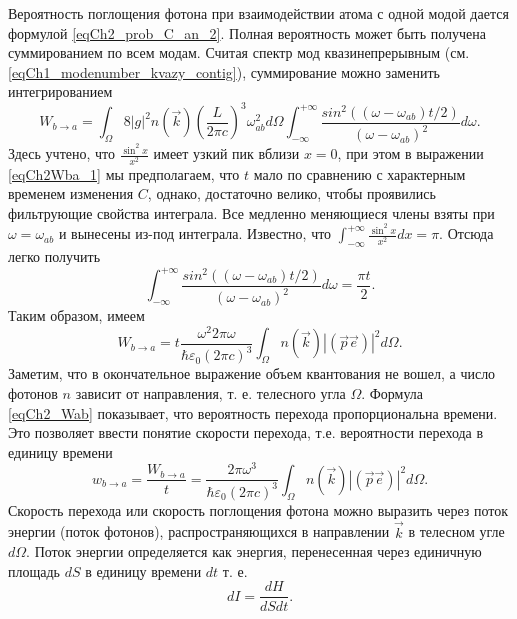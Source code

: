 Вероятность поглощения фотона  при взаимодействии атома с одной модой
дается формулой \eqref{eqCh2_prob_C_an_2}. Полная вероятность может
быть получена суммированием по всем модам. Считая спектр мод
квазинепрерывным (см. \eqref{eqCh1_modenumber_kvazy_contig}),
суммирование можно заменить интегрированием
\begin{equation}
W_{b \rightarrow a} = \int_{\Omega} 8 \left|g\right|^2 n(\vec{k})
\left(\frac{L}{2 \pi c}\right)^3 \omega_{ab}^2 d \Omega 
\int_{-\infty}^{+\infty} 
\frac{sin^2\left(\left(\omega - 
  \omega_{ab}\right)t/2\right)} {\left(\omega - 
  \omega_{ab}\right)^2} d \omega.
\label{eqCh2Wba_1}
\end{equation}
Здесь учтено, что $\frac{\sin^2 x}{x^2}$   имеет узкий пик вблизи $x =
0$, при этом в выражении \eqref{eqCh2Wba_1} мы предполагаем, что $t$ мало по
сравнению с характерным временем изменения $C$, однако, достаточно
велико, чтобы проявились фильтрующие свойства интеграла.
Все
медленно меняющиеся члены взяты при $\omega = \omega_{ab}$ и вынесены
из-под интеграла. Известно, что $\int_{-\infty}^{+\infty} \frac{\sin^2
x}{x^2} dx = \pi$.  Отсюда легко получить  
\[
\int_{-\infty}^{+\infty} \frac{sin^2\left(\left(\omega - 
  \omega_{ab}\right)t/2\right)} {\left(\omega - 
  \omega_{ab}\right)^2} d \omega = \frac{\pi t }{2}.
\]
Таким образом, имеем   
\begin{equation}
W_{b \rightarrow a} = t \frac{\omega^2 2 \pi \omega}
{\hbar \varepsilon_0 \left(2 \pi c\right)^3}\int_{\Omega} 
n(\vec{k})\left|\left(\vec{p} \vec{e}\right)\right|^2
d \Omega.
\label{eqCh2_Wab} 
\end{equation}
Заметим, что в окончательное выражение объем квантования не
вошел, а число фотонов $n$ зависит от направления, т. е. телесного
угла $\Omega$. Формула \eqref{eqCh2_Wab}  показывает, что вероятность перехода 
пропорциональна времени. Это позволяет ввести понятие скорости
перехода, т.е. вероятности перехода в единицу времени 
\begin{equation}
w_{b \rightarrow a} = \frac{W_{b \rightarrow a}}{t} = \frac{2 \pi
  \omega^3 }  
{\hbar \varepsilon_0 \left(2 \pi c\right)^3}\int_{\Omega} 
n(\vec{k}) \left|\left(\vec{p} \vec{e}\right)\right|^2
d \Omega.
\label{eqCh2_wab} 
\end{equation}
Скорость перехода или скорость поглощения фотона можно выразить
\cite{bLuisell1972} через поток энергии (поток фотонов),
распространяющихся в направлении $\vec{k}$ в  
телесном угле $d \Omega$.  Поток энергии определяется как энергия,
перенесенная через единичную площадь $dS$ в единицу времени $dt$ т. е.
\[
d I = \frac{dH}{dS dt}.
\]


